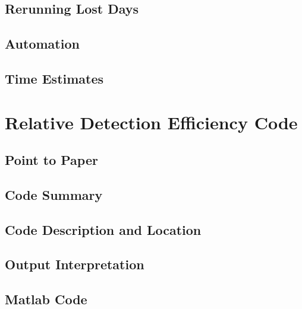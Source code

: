 \subsection{Rerunning Lost Days}

\subsection{Automation}

\subsection{Time Estimates}

\section{Relative Detection Efficiency Code}

\subsection{Point to Paper}

\subsection{Code Summary}

\subsection{Code Description and Location}

\subsection{Output Interpretation}

\subsection{Matlab Code}